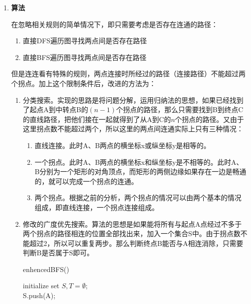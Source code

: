 \documentclass[12pt,a4paper]{article}
\theoremstyle{definition}
\begin{document}
\begin{enumerate}
	\item{
		\textbf{算法}
		
		在忽略相关规则的简单情况下，即只需要考虑是否存在连通的路径：
		\begin{enumerate}
			\item 直接DFS遍历图寻找两点间是否存在路径
			\item 直接BFS遍历图寻找两点间是否存在路径
		\end{enumerate}
		但是连连看有特殊的规则，两点连接时所经过的路径（连接路径）不能超过两个拐点。加上这个限制条件后，改进的方法为：
		\begin{enumerate}
			\item{
				分类搜索。实现的思路是将问题分解，运用归纳法的思想，如果已经找到了起点A到中转点B的$(n-1)$个拐点的路径，那么只需要找到B到终点C的直线路径，把他们接在一起就得到了从A到C的$n$个拐点的路径。又由于这里拐点数不能超过两个，所以这里的两点间连通实际上只有三种情况：
				\begin{enumerate}
					\item 直线连接。此时A、B两点的横坐标x或纵坐标y是相等的。
					\item 一个拐点。此时A、B两点的横坐标x和纵坐标y是不相等的。此时A、B分别为一个矩形的对角顶点，而矩形的两侧边缘如果存在一边是畅通的，就可以完成一个拐点的连通。
					\item 两个拐点。根据之前的分析，两个拐点的情况可以由两个基本的情况组成，即直线连接，一个拐点连接组成。
				\end{enumerate}
			} 
			
			\item{修改的广度优先搜索。算法的思想是如果能将所有与起点A点经过不多于两个拐点的路径相连的位置全部找出来，加入一个集合S中。由于拐点数不能超过2，所以可以重复两步。那么判断终点B能否与A相连消除，只需要判断B是否属于S即可。
				\begin{center}
					\begin{algorithm}[H]
						\caption{enhencedBFS()}
						initialize set $S,T=\emptyset$;\\
						S.push(A);\\
					\end{algorithm}
				\end{center}
			}
		\end{enumerate}
	}
	

\end{enumerate}
\end{document}
